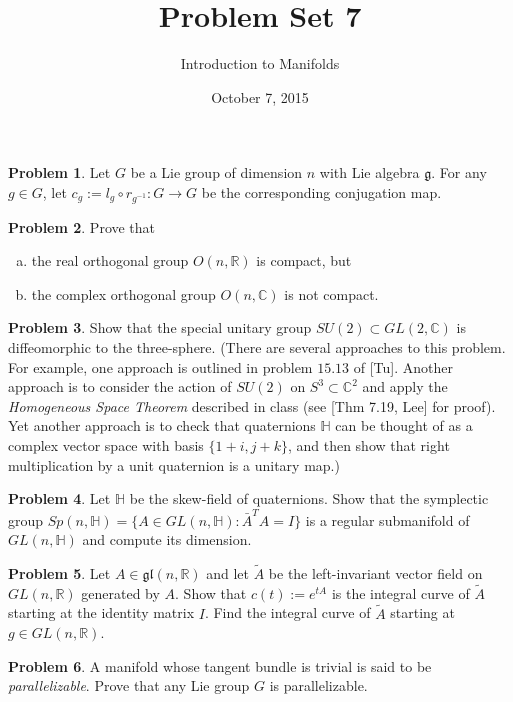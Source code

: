 \documentclass{amsart}
\newcommand{\+}[1]{\ensuremath{\mathbf{#1}}}
\newcommand{\C}{{\mathbb C}}
\newcommand{\QH}{{\mathbb H}}
\newcommand{\R}{{\mathbb R}}
\theoremstyle{definition}
\newtheorem{prob}{Problem}
\begin{document}
\title{Problem Set 7}
\date{October 7, 2015}
\author{Introduction to Manifolds}

\maketitle

\begin{prob}
Let $G$ be a Lie group of dimension $n$ with Lie algebra $\mathfrak{g}$.
For any $g \in G$, let $c_g := l_g \circ r_{g^{-1}}:G \to G$
be the corresponding conjugation map.
\end{prob}


\begin{prob}
Prove that 
\begin{enumerate}[(a)]
 \item the real orthogonal group $O(n,\R)$ is compact, but
 \item the complex orthogonal group $O(n,\C)$ is not compact.
\end{enumerate}
\end{prob}


\begin{prob}
Show that the special unitary group $SU(2) \subset GL(2,\C)$
is diffeomorphic to the three-sphere.
(There are several approaches to this problem.  For example, one approach is
outlined in problem $15.13$ of [Tu].  Another approach is to consider
the action of $SU(2)$ on $S^3 \subset \C^2$ and apply
the \emph{Homogeneous Space Theorem} described in class (see [Thm 7.19, Lee] for proof).  Yet another approach is to check that quaternions $\QH$ can be thought of as a complex vector space with basis $\{1+i,j+k\}$, and then show that
right multiplication by a unit quaternion is a unitary map.)
 \end{prob}

 \begin{prob}
 Let $\QH$ be the skew-field of quaternions.
  Show that the symplectic group $Sp(n,\QH) = 
  \{A \in GL(n,\QH): \bar{A}^TA = I\}$
  is a regular submanifold of $GL(n,\QH)$
  and compute its dimension.
 \end{prob}


 \begin{prob}
Let $A \in \mathfrak{gl}(n,\R)$ and let $\tilde{A}$ be the
left-invariant vector field on $GL(n,\R)$ generated by $A$.
Show that $c(t) := e^{tA}$ is the integral curve of $\tilde{A}$
starting at the identity matrix $I$.
Find the integral curve of $\tilde{A}$ starting at $g \in GL(n,\R)$.
 \end{prob}


\begin{prob}
A manifold whose tangent bundle is trivial is said to be
\emph{parallelizable}.
Prove that any Lie group $G$ is parallelizable.
\end{prob}
 
\end{document}
